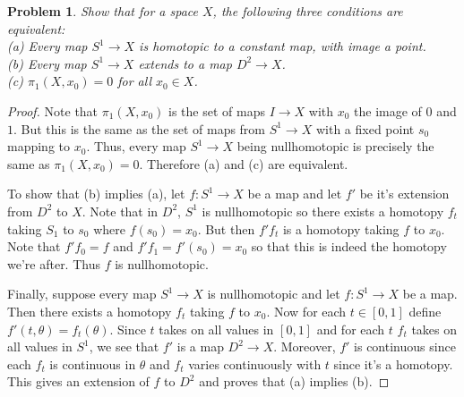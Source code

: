 \documentclass{article}
\newtheorem{problem}{Problem}
\begin{document}
\begin{problem}
Show that for a space $X$, the following three conditions are equivalent:\\
(a) Every map $S^1 \to X$ is homotopic to a constant map, with image a point.\\
(b) Every map $S^1 \to X$ extends to a map $D^2 \to X$.\\
(c) $\pi_1(X,x_0) = 0$ for all $x_0 \in X$.
\end{problem}
\begin{proof}
Note that $\pi_1(X,x_0)$ is the set of maps $I \to X$ with $x_0$ the image of $0$ and $1$. But this is the same as the set of maps from $S^1 \to X$ with a fixed point $s_0$ mapping to $x_0$. Thus, every map $S^1 \to X$ being nullhomotopic is precisely the same as $\pi_1(X,x_0) = 0$. Therefore (a) and (c) are equivalent.

To show that (b) implies (a), let $f : S^1 \to X$ be a map and let $f'$ be it's extension from $D^2$ to $X$. Note that in $D^2$, $S^1$ is nullhomotopic so there exists a homotopy $f_t$ taking $S_1$ to $s_0$ where $f(s_0) = x_0$. But then $f'f_t$ is a homotopy taking $f$ to $x_0$. Note that $f'f_0 = f$ and $f'f_1 = f'(s_0) = x_0$ so that this is indeed the homotopy we're after. Thus $f$ is nullhomotopic.
\vspace{100pt}

Finally, suppose every map $S^1 \to X$ is nullhomotopic and let $f : S^1 \to X$ be a map. Then there exists a homotopy $f_t$ taking $f$ to $x_0$. Now for each $t \in [0,1]$ define $f'(t,\theta) = f_t(\theta)$. Since $t$ takes on all values in $[0,1]$ and for each $t$ $f_t$ takes on all values in $S^1$, we see that $f'$ is a map $D^2 \to X$. Moreover, $f'$ is continuous since each $f_t$ is continuous in $\theta$ and $f_t$ varies continuously with $t$ since it's a homotopy. This gives an extension of $f$ to $D^2$ and proves that (a) implies (b).
\vspace{100pt}
\end{proof}
\end{document}
